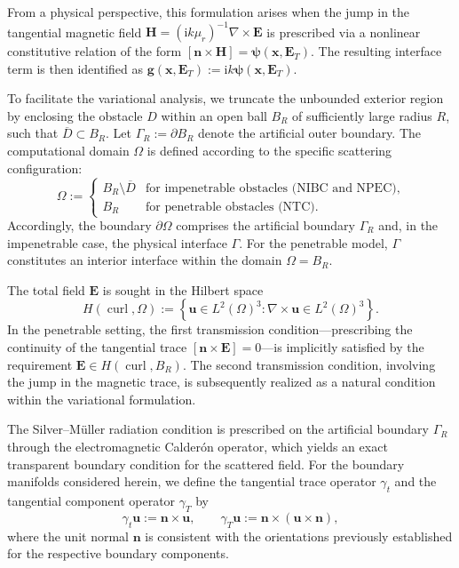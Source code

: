 \documentclass[10pt,a4paper]{amsart}
\numberwithin{equation}{section}
\begin{document}
\begin{itemize}
    From a physical perspective, this formulation arises when the jump in the tangential magnetic field $\mathbf{H} = (\mathrm{i}k\mu_r)^{-1} \nabla \times \mathbf{E}$ is prescribed via a nonlinear constitutive relation of the form $[\mathbf{n} \times \mathbf{H}] = \boldsymbol{\psi}(\boldsymbol{x}, \mathbf{E}_T)$. The resulting interface term is then identified as $\mathbf{g}(\boldsymbol{x}, \mathbf{E}_T):= \mathrm{i}k \boldsymbol{\psi}(\boldsymbol{x}, \mathbf{E}_T)$.
\end{itemize}





To facilitate the variational analysis, we truncate the unbounded exterior region by enclosing the obstacle $D$ within an open ball $B_R$ of sufficiently large radius $R$, such that $\overline{D} \subset B_R$. Let $\Gamma_R:= \partial B_R$ denote the artificial outer boundary. The computational domain $\Omega$ is defined according to the specific scattering configuration:
\[
\Omega:=
\begin{cases}
B_R \setminus \overline{D} & \text{for impenetrable obstacles (NIBC and NPEC),} \\
B_R & \text{for penetrable obstacles (NTC).}
\end{cases}
\]
Accordingly, the boundary $\partial\Omega$ comprises the artificial boundary $\Gamma_R$ and, in the impenetrable case, the physical interface $\Gamma$. For the penetrable model, $\Gamma$ constitutes an interior interface within the domain $\Omega = B_R$.

The total field $\mathbf{E}$ is sought in the Hilbert space
\[
H(\operatorname{curl}, \Omega):= \left\{ \mathbf{u} \in L^2(\Omega)^3 : \nabla \times \mathbf{u} \in L^2(\Omega)^3 \right\}.
\]
In the penetrable setting, the first transmission condition---prescribing the continuity of the tangential trace $[\mathbf{n} \times \mathbf{E}] = 0$---is implicitly satisfied by the requirement $\mathbf{E} \in H(\operatorname{curl}, B_R)$. The second transmission condition, involving the jump in the magnetic trace, is subsequently realized as a natural condition within the variational formulation.

The Silver--M\"uller radiation condition is prescribed on the artificial boundary $\Gamma_R$ through the electromagnetic Calder\'on operator, which yields an exact transparent boundary condition for the scattered field. For the boundary manifolds considered herein, we define the tangential trace operator $\gamma_t$ and the tangential component operator $\gamma_T$ by
\[
\gamma_t \mathbf{u} := \mathbf{n} \times \mathbf{u}, \qquad \gamma_T \mathbf{u} := \mathbf{n} \times (\mathbf{u} \times \mathbf{n}),
\]
where the unit normal $\mathbf{n}$ is consistent with the orientations previously established for the respective boundary components.
\end{document}
